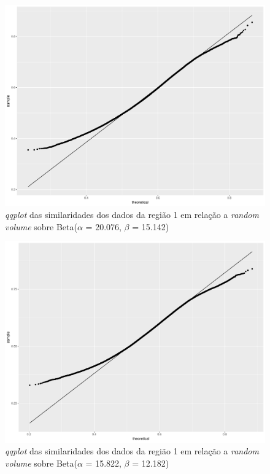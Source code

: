 \documentclass[12pt]{article}
\begin{document}
\begin{figure}[!h]

  \centering
  \includegraphics[width=0.8\linewidth]{../../Figures/Report_19_02_27/qqplot_region1.pdf}
  \caption{\textit{qqplot} das similaridades dos dados da região 1 em relação a \textit{random volume} sobre Beta($\alpha$ = 20.076, $\beta$ = 15.142)}
  \label{fig:qqplot_beta_rv1}

\end{figure}

\begin{figure}[!h]

  \centering
  \includegraphics[width=0.8\linewidth]{../../Figures/Report_19_02_27/qqplot_region2.pdf}
  \caption{\textit{qqplot} das similaridades dos dados da região 1 em relação a \textit{random volume} sobre Beta($\alpha$ = 15.822, $\beta$ = 12.182)}
  \label{fig:qqplot_beta_rv2}

\end{figure}
\end{document}
